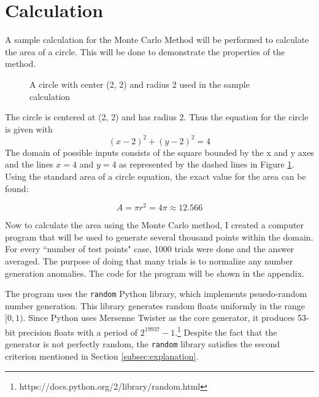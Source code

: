 \documentclass[10pt, letterpaper]{article}
\begin{document}
  \section{Calculation} \label{sec:usage}

  A sample calculation for the Monte Carlo Method will be performed to calculate the area of a circle. This will be done to demonstrate the properties of
  the method.

  \begin{figure}
    \centering
    \caption{A circle with center (2, 2) and radius 2 used in the sample calculation} \label{fig:circle}
  \end{figure}

  The circle is centered at (2, 2) and has radius 2. Thus the equation for the circle is given with
  \[ (x-2)^2 + (y-2)^2 = 4 \]
  The domain of possible inputs consists of the square bounded by the x and y axes and the lines
  $x = 4$ and $y = 4$ as represented by the dashed lines in Figure \ref{fig:circle}. \\

  Using the standard area of a circle equation, the exact value for the area can be found:

  \[ A = \pi r^2 = 4\pi \approx 12.566 \]

  Now to calculate the area using the Monte Carlo method, I created a computer program that will be used to generate several thousand
  points within the domain. For every ``number of test points" case, 1000 trials were done and the answer averaged.
  The purpose of doing that many trials is to normalize any number generation anomalies. The code for the program will be shown in the
  appendix.

  The program uses the \texttt{random} Python library, which implements psuedo-random number generation.
  This library generates random floats uniformly in the range $[0, 1)$. Since Python uses Mersenne Twister as the core generator,
  it produces 53-bit precision floats with a period of $2^{19937} - 1$.\footnote{https://docs.python.org/2/library/random.html}
  Despite the fact that the generator is not perfectly random, the \texttt{random} library satisfies the second criterion mentioned
  in Section \ref{subsec:explanation}.
\end{document}
